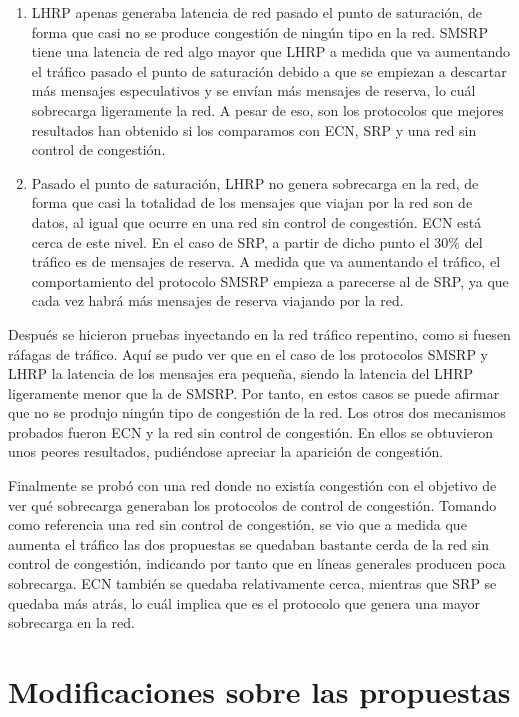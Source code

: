\documentclass[11pt,a4paper]{article}
\begin{document}
\begin{enumerate}
	\item LHRP apenas generaba latencia de red pasado el punto de saturación, de forma
	que casi no se produce congestión de ningún tipo en la red. SMSRP tiene una latencia de
	red algo mayor que LHRP a medida que va aumentando el tráfico pasado el punto de
	saturación debido a que se empiezan a descartar más mensajes especulativos y se envían
	más mensajes de reserva, lo cuál sobrecarga ligeramente la red. A pesar
	de eso, son los protocolos que mejores resultados han obtenido si los comparamos con ECN,
	SRP y una red sin control de congestión.
	\item Pasado el punto de saturación, LHRP no genera sobrecarga en la red, de forma que casi
	la totalidad de los mensajes que viajan por la red son de datos, al igual que ocurre en una
	red sin control de congestión. ECN está cerca de este nivel. En el caso de SRP, a partir
	de dicho punto el 30\% del tráfico es de mensajes de reserva. A medida que va aumentando
	el tráfico, el comportamiento del protocolo SMSRP empieza a parecerse al de SRP, ya que
	cada vez habrá más mensajes de reserva viajando por la red.	
\end{enumerate}

Después se hicieron pruebas inyectando en la red tráfico repentino, como si fuesen ráfagas
de tráfico. Aquí se pudo ver que en el caso de los protocolos SMSRP y LHRP la latencia de
los mensajes era pequeña, siendo la latencia del LHRP ligeramente menor que la de SMSRP. Por
tanto, en estos casos se puede afirmar que no se produjo ningún tipo de congestión de la red. Los
otros dos mecanismos probados fueron ECN y la red sin control de congestión. En ellos se
obtuvieron unos peores resultados, pudiéndose apreciar la aparición de congestión.

Finalmente se probó con una red donde no existía congestión con el objetivo de ver qué sobrecarga
generaban los protocolos de control de congestión. Tomando como referencia una red sin control
de congestión, se vio que a medida que aumenta el tráfico las dos propuestas se quedaban
bastante cerda de la red sin control de congestión, indicando por tanto que en líneas generales
producen poca sobrecarga. ECN también se quedaba relativamente cerca, mientras que SRP se quedaba
más atrás, lo cuál implica que es el protocolo que genera una mayor sobrecarga en la red.

\section{Modificaciones sobre las propuestas}
\end{document}
